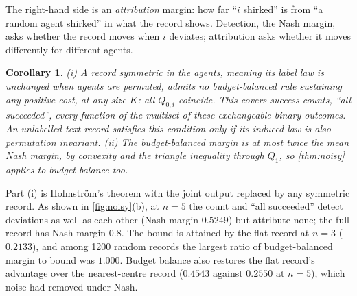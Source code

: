 \documentclass[sigconf,anonymous,acmthm=false]{aamas}
\theoremstyle{acmplain}
\newtheorem{corollary}{Corollary}
\theoremstyle{acmdefinition}
\begin{document}
The right-hand side is an \emph{attribution} margin: how far ``$i$ shirked'' is from ``a
random agent shirked'' in what the record shows. Detection, the Nash margin, asks whether
the record moves when $i$ deviates; attribution asks whether it moves differently for
different agents.

\begin{corollary}\label{cor:bb}
(i) A record symmetric in the agents, meaning its label law is unchanged when agents are
permuted, admits no budget-balanced rule sustaining any positive cost, at any size $K$: all
$Q_{0,i}$ coincide. This covers success counts, ``all succeeded'', every function of the
multiset of these exchangeable binary outcomes. An unlabelled text record satisfies this
condition only if its induced law is also permutation invariant. (ii) The
budget-balanced margin is at most twice the mean Nash margin, by convexity and the triangle
inequality through $Q_1$, so \cref{thm:noisy} applies to budget balance too.
\end{corollary}

Part (i) is Holmstr\"om's theorem with the joint output replaced by any symmetric record. As
shown in \cref{fig:noisy}(b), at $n=5$ the count and ``all succeeded'' detect deviations as
well as each other (Nash margin $0.5249$) but attribute none; the full record has
Nash margin $0.8$. The bound is attained by the
flat record at $n=3$ ($0.2133$), and among 1200 random records the largest ratio of
budget-balanced margin to bound was $1.000$. Budget balance also restores the flat record's
advantage over the nearest-centre record ($0.4543$ against $0.2550$ at $n=5$), which noise
had removed under Nash.
\end{document}
